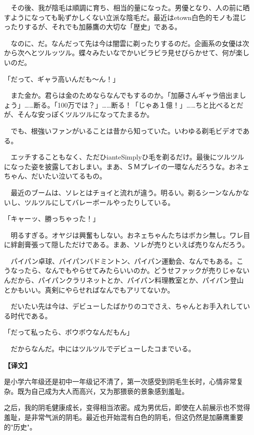 \documentclass[12pt,UTF8]{ctexbook}
\begin{document}
{{　その後、我が陰毛は順調に育ち、相当的量になった。男優となり、人の前に晒すようになっても恥ずかしくない立派な陰毛だ。最近はetown白色的モノも混じったりするが、それでも加藤鷹の大切な「歴史」である。

　なのに、だ。なんだって先は今は闇雲に剃ったりするのだ。企画系の女優は次から次へとツルッツル。蝶々みたいなでかいビラビラ見せびらかせて、何が楽しいのだ。

「だって、ギャラ高いんだも～ん！」

　また金か。君らは金のためならなんでもするのか。「加藤さんギャラ倍出ましょう」……断る。「100万では？」……断る！「じゃあ１億！」……ちと比べるとだが、そんな安っぽくツルツルになってたまるか。

　でも、根強いファンがいることは昔から知っていた。いわゆる剃毛ビデオである。

　エッチすることもなく、ただひianteSimplyひ毛を剃るだけ。最後にツルツルになった姿を披露しておしまい。まあ、ＳＭプレイの一環なんだろうな。おネェちゃん、だいたい泣いてるもの。

　最近のブームは、ソレとはチョイと流れが違う。明るい。剃るシーンなんかないし、ツルツルにしてバレーボールやったりしている。

「キャーッ、勝っちゃった！」

　明るすぎる。オヤジは興奮もしない。おネェちゃんたちはボカシ無し。ワレ目に絆創膏張って隠しただけである。まあ、ソレが売りといえば売りなんだろう。

　パイパン卓球、パイパンバドミントン、パイパン運動会、なんでもある。こうなったら、なんでもやらせてみたらいいのか。どうせファックが売りじゃないんだから、パイパンクラリネットとか、パイパン料理教室とか、パイパン登山とかもいい。真剣にやらせればなんでもアリてないか。

　だいたい先は今は、デビューしたばかりのコでさえ、ちゃんとお手入れしている时代である。

「だって私ったら、ボウボウなんだもん」

　だからなんだ。中にはツルツルでデビューしたコまでいる。
}

\vspace{2ex}
\parbox{0.9\linewidth}{
\textbf{【译文】}\par

是小学六年级还是初中一年级记不清了，第一次感受到阴毛生长时，心情非常复杂。既为自己成为大人而高兴，又为那猥亵的景象感到羞耻。

之后，我的阴毛健康成长，变得相当浓密。成为男优后，即使在人前展示也不觉得羞耻，是非常气派的阴毛。最近也开始混有白色的阴毛，但这仍然是加藤鹰重要的"历史"。

}}
\end{document}
